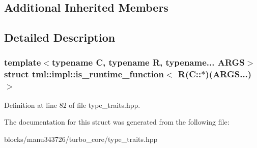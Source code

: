 \subsection*{Additional Inherited Members}


\subsection{Detailed Description}
\subsubsection*{template$<$typename C, typename R, typename... A\+R\+G\+S$>$struct tml\+::impl\+::is\+\_\+runtime\+\_\+function$<$ R(\+C\+::$\ast$)(\+A\+R\+G\+S...)$>$}



Definition at line 82 of file type\+\_\+traits.\+hpp.



The documentation for this struct was generated from the following file\+:\begin{DoxyCompactItemize}
\item 
blocks/manu343726/turbo\+\_\+core/type\+\_\+traits.\+hpp\end{DoxyCompactItemize}
